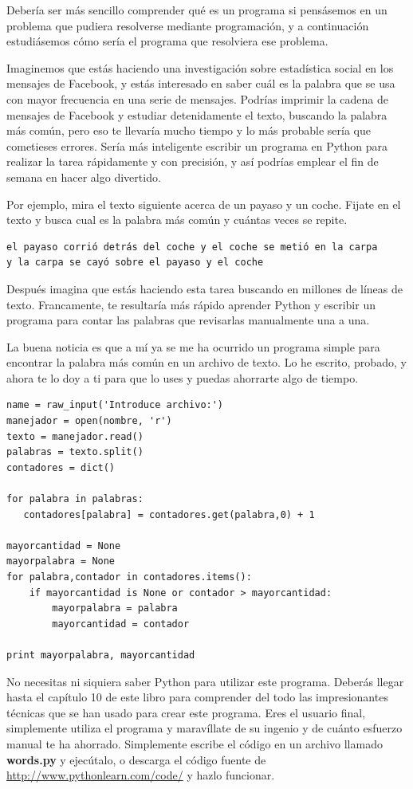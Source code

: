 Debería ser más sencillo comprender qué es un programa si pensásemos en un problema
que pudiera resolverse mediante programación, y a continuación estudiásemos cómo sería el
programa que resolviera ese problema.

Imaginemos que estás haciendo una investigación sobre estadística social en los mensajes
de Facebook, y estás interesado en saber cuál es la palabra que se usa con mayor frecuencia
en una serie de mensajes. Podrías imprimir la cadena de mensajes de Facebook y estudiar
detenidamente el texto, buscando la palabra más común, pero eso te llevaría mucho tiempo
y lo más probable sería que cometieses errores. Sería más inteligente escribir un programa
en Python para realizar la tarea rápidamente y con precisión, y así podrías emplear el fin
de semana en hacer algo divertido.

Por ejemplo, mira el texto siguiente acerca de un payaso y un coche. Fijate en el
texto y busca cual es la palabra más común y cuántas veces se repite.

\beforeverb
\begin{verbatim}
el payaso corrió detrás del coche y el coche se metió en la carpa
y la carpa se cayó sobre el payaso y el coche
\end{verbatim}
\afterverb
%
Después imagina que estás haciendo esta tarea buscando en millones de líneas de
texto. Francamente, te resultaría más rápido aprender Python y escribir un
programa para contar las palabras que revisarlas manualmente una a una.

La buena noticia es que a mí ya se me ha ocurrido un programa
simple para encontrar la palabra más común en un archivo de texto. Lo he escrito,
probado, y ahora te lo doy a ti para que lo uses y puedas ahorrarte algo de tiempo.

\beforeverb
\begin{verbatim}
name = raw_input('Introduce archivo:')
manejador = open(nombre, 'r')
texto = manejador.read()
palabras = texto.split()
contadores = dict()

for palabra in palabras:
   contadores[palabra] = contadores.get(palabra,0) + 1

mayorcantidad = None
mayorpalabra = None
for palabra,contador in contadores.items():
    if mayorcantidad is None or contador > mayorcantidad:
        mayorpalabra = palabra
        mayorcantidad = contador

print mayorpalabra, mayorcantidad
\end{verbatim}
\afterverb
%
No necesitas ni siquiera saber Python para utilizar este programa. Deberás llegar hasta
el capítulo 10 de este libro para comprender del todo las impresionantes técnicas que
se han usado para crear este programa. Eres el usuario final, simplemente utiliza el
programa y maravíllate de su ingenio y de cuánto esfuerzo manual te ha ahorrado.
Simplemente escribe el código
en un archivo llamado {\bf words.py} y ejecútalo, o descarga el código fuente
de \url{http://www.pythonlearn.com/code/} y hazlo funcionar.

